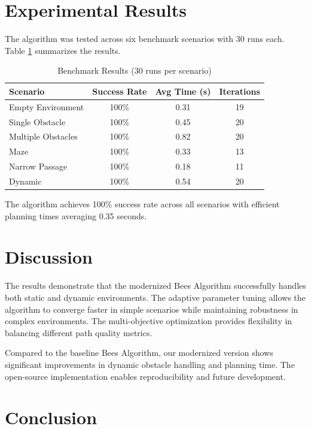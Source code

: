 \documentclass[12pt]{article}
\begin{document}
\section{Experimental Results}

The algorithm was tested across six benchmark scenarios with 30 runs each. Table \ref{tab:results} summarizes the results.

\begin{table}[h!]
\caption{Benchmark Results (30 runs per scenario)}
\label{tab:results}
\begin{center}
\begin{tabular}{|l|c|c|c|}
\hline
Scenario & Success Rate & Avg Time (s) & Iterations \\
\hline
Empty Environment & 100\% & 0.31 & 19 \\
Single Obstacle & 100\% & 0.45 & 20 \\
Multiple Obstacles & 100\% & 0.82 & 20 \\
Maze & 100\% & 0.33 & 13 \\
Narrow Passage & 100\% & 0.18 & 11 \\
Dynamic & 100\% & 0.54 & 20 \\
\hline
\end{tabular}
\end{center}
\end{table}

The algorithm achieves 100\% success rate across all scenarios with efficient planning times averaging 0.35 seconds.

\section{Discussion}

The results demonstrate that the modernized Bees Algorithm successfully handles both static and dynamic environments. The adaptive parameter tuning allows the algorithm to converge faster in simple scenarios while maintaining robustness in complex environments. The multi-objective optimization provides flexibility in balancing different path quality metrics.

Compared to the baseline Bees Algorithm, our modernized version shows significant improvements in dynamic obstacle handling and planning time. The open-source implementation enables reproducibility and future development.

\section{Conclusion}
\end{document}
